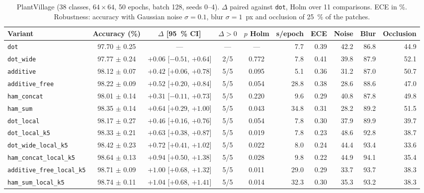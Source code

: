 
\begin{table}[!t]
\centering
\footnotesize
\caption{PlantVillage (38 classes, $64\times64$, 50 epochs, batch 128, seeds 0--4). $\Delta$ paired against \texttt{dot}, Holm over 11 comparisons. ECE in \%. Robustness: accuracy with Gaussian noise $\sigma=0.1$, blur $\sigma=1$~px and occlusion of 25~\% of the patches.}
\label{tab:plantvillage}
\begin{adjustbox}{max width=\linewidth}
\begin{tabular}{lccccrrrrr}
\toprule
Variant & Accuracy (\%) & $\Delta$ [95~\% CI] & $\Delta>0$ & $p$ Holm & s/epoch & ECE & Noise & Blur & Occlusion \\
\midrule
\texttt{dot} & 97.70 $\pm$ 0.25 & --- & --- & --- & 7.7 & 0.39 & 42.2 & 86.8 & 44.9 \\
\texttt{dot\_wide} & 97.77 $\pm$ 0.24 & $+0.06$ [$-0.51$, $+0.64$] & 2/5 & 0.772 & 7.8 & 0.41 & 39.8 & 87.9 & 52.1 \\
\texttt{additive} & 98.12 $\pm$ 0.07 & $+0.42$ [$+0.06$, $+0.78$] & 5/5 & 0.095 & 5.1 & 0.36 & 31.2 & 87.0 & 50.7 \\
\texttt{additive\_free} & 98.22 $\pm$ 0.09 & $+0.52$ [$+0.20$, $+0.84$] & 5/5 & 0.054 & 28.8 & 0.38 & 28.6 & 88.6 & 47.0 \\
\texttt{ham\_concat} & 98.01 $\pm$ 0.14 & $+0.31$ [$-0.11$, $+0.73$] & 5/5 & 0.220 & 9.6 & 0.29 & 40.8 & 87.8 & 49.8 \\
\texttt{ham\_sum} & 98.35 $\pm$ 0.14 & $+0.64$ [$+0.29$, $+1.00$] & 5/5 & 0.043 & 34.8 & 0.31 & 28.2 & 89.2 & 51.5 \\
\texttt{dot\_local} & 98.17 $\pm$ 0.27 & $+0.46$ [$+0.16$, $+0.76$] & 5/5 & 0.054 & 7.8 & 0.30 & 37.9 & 89.9 & 39.7 \\
\texttt{dot\_local\_k5} & 98.33 $\pm$ 0.21 & $+0.63$ [$+0.38$, $+0.87$] & 5/5 & 0.019 & 7.8 & 0.23 & 48.6 & 92.8 & 38.7 \\
\texttt{dot\_wide\_local\_k5} & 98.42 $\pm$ 0.23 & $+0.72$ [$+0.41$, $+1.02$] & 5/5 & 0.022 & 8.0 & 0.24 & 44.4 & 93.4 & 33.6 \\
\texttt{ham\_concat\_local\_k5} & 98.64 $\pm$ 0.13 & $+0.94$ [$+0.50$, $+1.38$] & 5/5 & 0.028 & 9.8 & 0.22 & 44.9 & 94.1 & 35.4 \\
\texttt{additive\_free\_local\_k5} & 98.71 $\pm$ 0.09 & $+1.00$ [$+0.68$, $+1.32$] & 5/5 & 0.011 & 29.0 & 0.29 & 33.7 & 93.7 & 38.3 \\
\texttt{ham\_sum\_local\_k5} & 98.74 $\pm$ 0.11 & $+1.04$ [$+0.68$, $+1.41$] & 5/5 & 0.014 & 32.3 & 0.30 & 35.3 & 93.2 & 38.3 \\
\bottomrule
\end{tabular}
\end{adjustbox}
\end{table}
